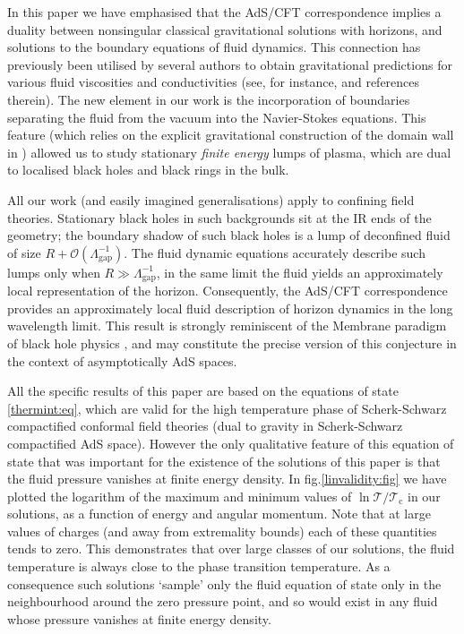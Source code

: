 \documentclass[12pt,a4paper]{article}
\newcommand{\CO}{\mathcal{O}}
\newcommand{\tc}{\mathcal{T_\mathrm{c}}}
\newcommand{\tloc}{\mathcal{T}}
\begin{document}
In this paper we have emphasised that the AdS/CFT correspondence
implies a duality between nonsingular classical gravitational
solutions with horizons, and solutions to the boundary equations of
fluid dynamics. This connection has previously been utilised by
several authors to obtain gravitational predictions for various
fluid viscosities and conductivities (see, for instance,
\cite{Son:2007vk} and references therein). The new element in our
work is the incorporation of boundaries separating the fluid from
the vacuum into the Navier-Stokes equations. This feature (which
relies on the explicit gravitational construction of the domain wall
in \cite{Aharony:2005bm}) allowed us to study stationary
\emph{finite energy} lumps of plasma, which are dual to localised
black holes and black rings in the bulk.

All our work (and easily imagined generalisations) apply to
confining field theories. Stationary black holes in such backgrounds
sit at the IR ends of the geometry; the boundary shadow of such
black holes is a lump of deconfined fluid of size $R + \CO
(\Lambda^{-1}_\mathrm{gap})$. The fluid dynamic equations accurately
describe such lumps only when $R  \gg \Lambda_\mathrm{gap}^{-1}$, in
the same limit the fluid yields an approximately local
representation of the horizon. Consequently, the AdS/CFT
correspondence provides an approximately local fluid description of
horizon dynamics in the long wavelength limit. This result is strongly
reminiscent of the Membrane paradigm of black hole physics
\cite{Thorne+MacDonaldETAL-BlacHole:86, Parikh:1997ma,
Cardoso:2007ka}, and may constitute the precise version of this
conjecture in the context of asymptotically AdS spaces.

All the specific results of this paper are based on the equations of
state \eqref{thermint:eq}, which are valid for the high temperature
phase of Scherk-Schwarz compactified conformal field theories (dual
to gravity in Scherk-Schwarz compactified AdS space). However the
only qualitative feature of this equation of state that was
important for the existence of the solutions of this paper is that
the fluid pressure vanishes at finite energy density. In
fig.\ref{linvalidity:fig} we have plotted the logarithm of the
maximum and minimum values of $\ln \tloc/\tc$ in our solutions,  as a function of
energy and angular momentum. Note that at large values of charges
(and away from extremality bounds) each of these quantities tends to
zero. This demonstrates that over large classes of our solutions,
the fluid temperature is always close to the phase transition
temperature. As a consequence such solutions `sample' only the fluid
equation of state only in the neighbourhood around the zero pressure
point, and so would exist in any fluid whose pressure vanishes at finite energy density.
\end{document}
